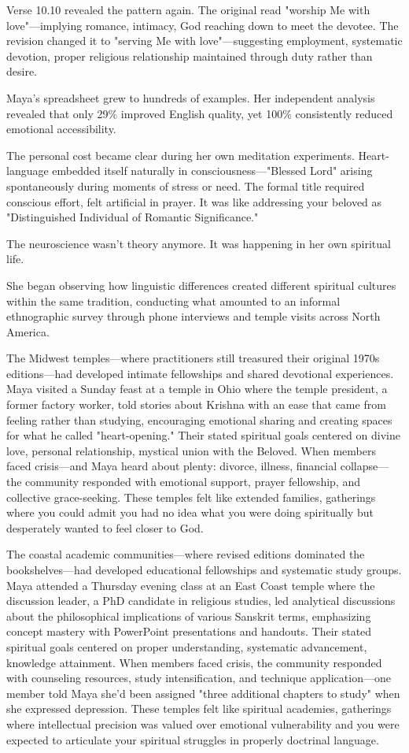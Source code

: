 \documentclass[12pt,twoside]{book}
\begin{document}
Verse 10.10 revealed the pattern again. The original read "worship Me with love"—implying romance, intimacy, God reaching down to meet the devotee. The revision changed it to "serving Me with love"—suggesting employment, systematic devotion, proper religious relationship maintained through duty rather than desire.

Maya's spreadsheet grew to hundreds of examples. Her independent analysis revealed that only 29\% improved English quality, yet 100\% consistently reduced emotional accessibility.

The personal cost became clear during her own meditation experiments. Heart-language embedded itself naturally in consciousness—"Blessed Lord" arising spontaneously during moments of stress or need. The formal title required conscious effort, felt artificial in prayer. It was like addressing your beloved as "Distinguished Individual of Romantic Significance."

The neuroscience wasn't theory anymore. It was happening in her own spiritual life.

She began observing how linguistic differences created different spiritual cultures within the same tradition, conducting what amounted to an informal ethnographic survey through phone interviews and temple visits across North America.

The Midwest temples—where practitioners still treasured their original 1970s editions—had developed intimate fellowships and shared devotional experiences. Maya visited a Sunday feast at a temple in Ohio where the temple president, a former factory worker, told stories about Krishna with an ease that came from feeling rather than studying, encouraging emotional sharing and creating spaces for what he called "heart-opening." Their stated spiritual goals centered on divine love, personal relationship, mystical union with the Beloved. When members faced crisis—and Maya heard about plenty: divorce, illness, financial collapse—the community responded with emotional support, prayer fellowship, and collective grace-seeking. These temples felt like extended families, gatherings where you could admit you had no idea what you were doing spiritually but desperately wanted to feel closer to God.

The coastal academic communities—where revised editions dominated the bookshelves—had developed educational fellowships and systematic study groups. Maya attended a Thursday evening class at an East Coast temple where the discussion leader, a PhD candidate in religious studies, led analytical discussions about the philosophical implications of various Sanskrit terms, emphasizing concept mastery with PowerPoint presentations and handouts. Their stated spiritual goals centered on proper understanding, systematic advancement, knowledge attainment. When members faced crisis, the community responded with counseling resources, study intensification, and technique application—one member told Maya she'd been assigned "three additional chapters to study" when she expressed depression. These temples felt like spiritual academies, gatherings where intellectual precision was valued over emotional vulnerability and you were expected to articulate your spiritual struggles in properly doctrinal language.
\end{document}
